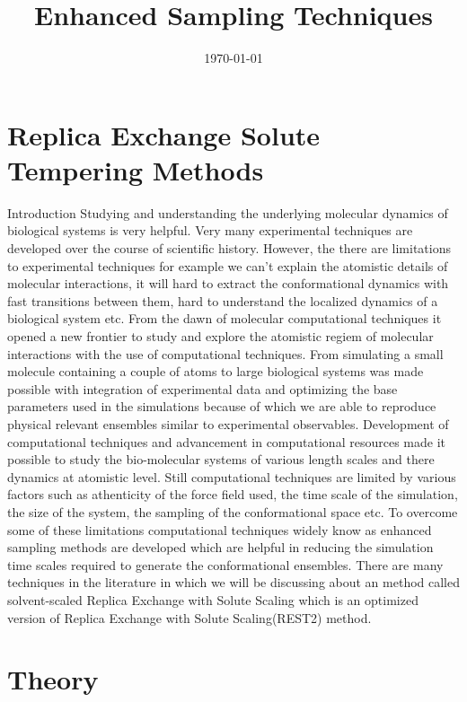 \documentclass{memoir}
\title{Enhanced Sampling Techniques}
\begin{document}
\date{\today}

\maketitle

\tableofcontents

\chapter{Replica Exchange Solute Tempering Methods}

{Introduction}
Studying and understanding the underlying molecular dynamics of biological systems is very helpful. Very many experimental techniques are developed over the course of scientific history.
However, the there are limitations to experimental techniques for example we can't explain the atomistic details of molecular interactions, it will hard to extract the conformational dynamics
with fast transitions between them, hard to understand the localized dynamics of a biological system etc. From the dawn of molecular computational techniques it opened a new frontier to study
and explore the atomistic regiem of molecular interactions with the use of computational techniques. From simulating a small molecule containing a couple of atoms to large biological systems 
was made possible with integration of experimental data and optimizing the base parameters used in the simulations because of which we are able to reproduce physical relevant ensembles similar 
to experimental observables. Development of computational techniques and advancement in computational 
resources made it possible to study the bio-molecular systems of various length scales and there dynamics at atomistic level. Still computational techniques are limited by various factors
such as athenticity of the force field used, the time scale of the simulation, the size of the system, the sampling of the conformational space etc. To overcome some of these limitations
computational techniques widely know as enhanced sampling methods are developed which are helpful in reducing the simulation time scales required to generate the conformational ensembles.
There are many techniques in the literature in which we will be discussing about an method called solvent-scaled Replica Exchange with Solute Scaling which is an optimized version of 
Replica Exchange with Solute Scaling(REST2) method.        
  
\chapter{Theory} 
\end{document}

